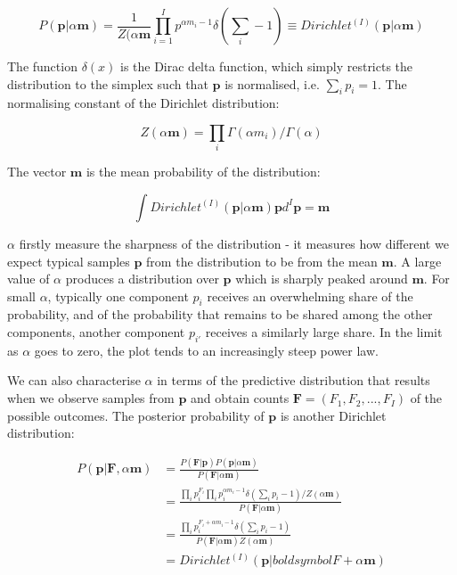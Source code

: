 \begin{equation}
P(\boldsymbol{p}|\alpha\boldsymbol{m})=\frac{1}{Z(\alpha\boldsymbol{m}}\prod_{i=1}^{I}p^{\alpha m_{i}-1}\delta\left (\sum_{i}-1\right )\equiv Dirichlet^{(I)}(\boldsymbol{p}|\alpha\boldsymbol{m})
\end{equation}

\noindent The function $\delta(x)$ is the Dirac delta function, which simply restricts the distribution to the simplex such that $\boldsymbol{p}$ is normalised, i.e. $\sum_{i}p_{i}=1$. The normalising constant of the Dirichlet distribution:

\begin{equation}
Z(\alpha\boldsymbol{m})=\prod_{i}\Gamma(\alpha m_{i})/\Gamma(\alpha)
\end{equation}

\noindent The vector $\boldsymbol{m}$ is the mean probability of the distribution:

\begin{equation}
\int Dirichlet^{(I)}(\boldsymbol{p}|\alpha\boldsymbol{m})\boldsymbol{p}d^{I}\boldsymbol{p}=\boldsymbol{m}
\end{equation}

$\alpha$ firstly measure the sharpness of the distribution - it measures how different we expect typical samples $\boldsymbol{p}$ from the distribution to be from the mean $\boldsymbol{m}$. A large value of $\alpha$ produces a distribution over $\boldsymbol{p}$ which is sharply peaked around $\boldsymbol{m}$. For small $\alpha$, typically one component $p_{i}$ receives an overwhelming share of the probability, and of the probability that remains to be shared among the other components, another component $p_{i'}$ receives a similarly large share. In the limit as $\alpha$ goes to zero, the plot tends to an increasingly steep power law.

We can also characterise $\alpha$ in terms of the predictive distribution that results when we observe samples from $\boldsymbol{p}$ and obtain counts $\boldsymbol{F}=(F_{1}, F_{2}, ..., F_{I})$ of the possible outcomes. The posterior probability of $\boldsymbol{p}$ is another Dirichlet distribution:

\begin{align}
P(\boldsymbol{p}|\boldsymbol{F}, \alpha\boldsymbol{m}) &= \frac{P(\boldsymbol{F}|\boldsymbol{p})P(\boldsymbol{p}|\alpha\boldsymbol{m})}{P(\boldsymbol{F}|\alpha\boldsymbol{m})}
\\
&= \frac{\prod_{i}p_{i}^{F_{i}}\prod_{i}p_{i}^{\alpha m_{i}-1} \delta \left (\sum_{i}p_{i}-1 \right)/Z(\alpha \boldsymbol{m})}{P(\boldsymbol{F}|\alpha\boldsymbol{m})}
\\
&= \frac{\prod_{i}p_{i}^{F_{i}+\alpha m_{i}-1} \delta \left(\sum_{i}p_{i}-1\right)}{P(\boldsymbol{F}|\alpha\boldsymbol{m})Z(\alpha\boldsymbol{m})}
\\
&= Dirichlet^{(I)}(\boldsymbol{p}|boldsymbol{F}+\alpha\boldsymbol{m})
\end{align}

